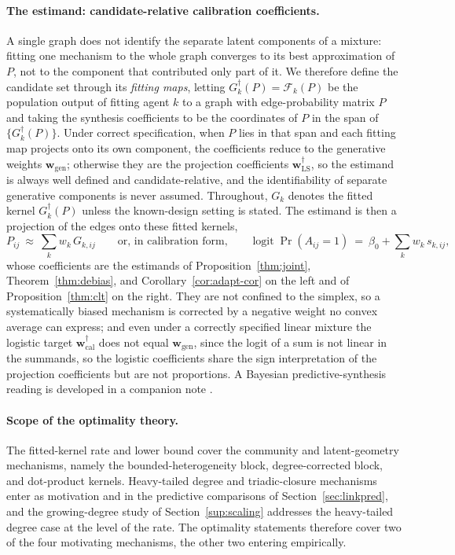 \documentclass[12pt]{article}
\newcommand{\1}{\mathbf{1}}
\newcommand{\bw}{\mathbf{w}}
\begin{document}
\paragraph{The estimand: candidate-relative calibration coefficients.}
A single graph does not identify the separate latent components of a mixture: fitting one mechanism to the
whole graph converges to its best approximation of $P$, not to the component that contributed only part of it.
We therefore define the candidate set through its \emph{fitting maps}, letting $G_k^\dagger(P)=\mathcal F_k(P)$
be the population output of fitting agent $k$ to a graph with edge-probability matrix $P$ and taking the
synthesis coefficients to be the coordinates of $P$ in the span of $\{G_k^\dagger(P)\}$. Under correct
specification, when $P$ lies in that span and each fitting map projects onto its own component, the
coefficients reduce to the generative weights $\bw_{\mathrm{gen}}$; otherwise they are the projection
coefficients $\bw^\dagger_{\mathrm{LS}}$, so the estimand is always well defined and candidate-relative, and
the identifiability of separate generative components is never assumed. Throughout, $G_k$ denotes the fitted
kernel $G_k^\dagger(P)$ unless the known-design setting is stated. The estimand is then a projection of the
edges onto these fitted kernels,
\[
P_{ij}\ \approx\ \sum_{k} w_k\,G_{k,ij}
\qquad\text{or, in calibration form,}\qquad
\operatorname{logit}\Pr(A_{ij}=1)\ =\ \beta_0+\sum_{k} w_k\,s_{k,ij},
\]
whose coefficients are the estimands of Proposition~\ref{thm:joint}, Theorem~\ref{thm:debias}, and
Corollary~\ref{cor:adapt-cor} on the left and of Proposition~\ref{thm:clt} on the right. They are not confined
to the simplex, so a systematically biased mechanism is corrected by a negative weight no convex average can
express; and even under a correctly specified linear mixture the logistic target $\bw^\dagger_{\mathrm{cal}}$
does not equal $\bw_{\mathrm{gen}}$, since the logit of a sum is not linear in the summands, so the logistic
coefficients share the sign interpretation of the projection coefficients but are not proportions. A Bayesian
predictive-synthesis reading is developed in a companion note \citep{west1992modelling,mcalinn2019dynamic,mcalinn2020multivariate}.

\paragraph{Scope of the optimality theory.} The fitted-kernel rate and lower bound cover the community and latent-geometry mechanisms, namely the bounded-heterogeneity block, degree-corrected block, and dot-product kernels. Heavy-tailed degree and triadic-closure mechanisms enter as motivation and in the predictive comparisons of Section~\ref{sec:linkpred}, and the growing-degree study of Section~\ref{sup:scaling} addresses the heavy-tailed degree case at the level of the rate. The optimality statements therefore cover two of the four motivating mechanisms, the other two entering empirically.
\end{document}
